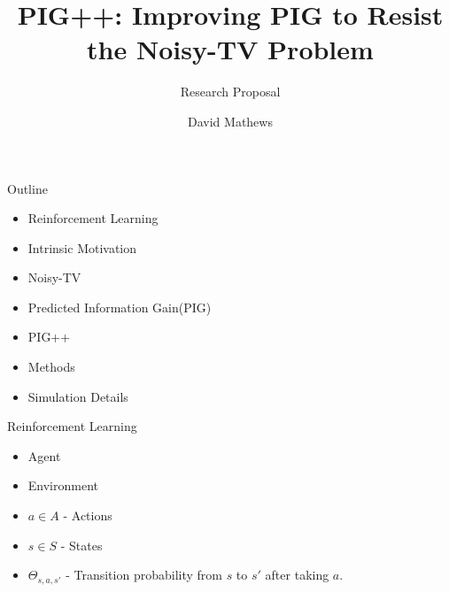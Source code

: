 

\title{PIG++: Improving PIG to Resist the Noisy-TV Problem}
\subtitle{Research Proposal}
\author{David Mathews}




\usepackage{bm}
\usepackage{amsmath}
\usepackage{array}
\usepackage{subfigure}
\setlength{\extrarowheight}{2pt}

\newcommand{\real}{\mathbb{R}}
\newcommand{\norm}[1]{\left\lVert#1\right\rVert}

\usepackage{calligra}
\usepackage{hyperref}


	
	\begin{frame}{}
		\maketitle
	\end{frame}
	
	
	\begin{frame}[fragile]{Outline}
		\begin{itemize}
			\item Reinforcement Learning
			\item Intrinsic Motivation
			\item Noisy-TV
			\item Predicted Information Gain(PIG)
			\item PIG++
			\item Methods
			\item Simulation Details
		\end{itemize}
	\end{frame}
	
	
	\begin{frame}[fragile]{Reinforcement Learning}
		\begin{itemize}
			\item {Agent}
			\item {Environment}
			\item {$a \in A$ - Actions}
			\item {$s \in S$ - States}
			\item { $\Theta_{s,a,s'}$ - Transition probability from $s$ to $s'$ after taking $a$.}
		\end{itemize}
	\end{frame}
	
